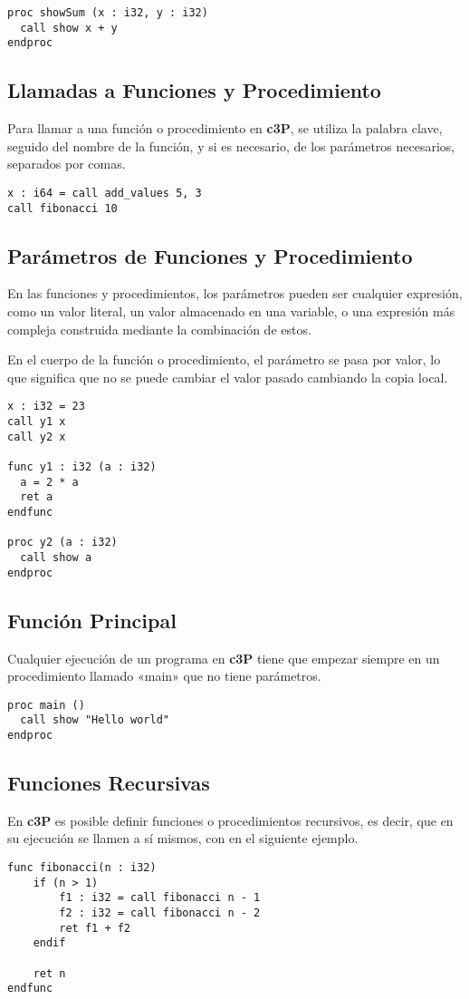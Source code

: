\begin{verbatim}
proc showSum (x : i32, y : i32)
  call show x + y
endproc
\end{verbatim}

\subsection{Llamadas a Funciones y Procedimiento}

Para llamar a una función o procedimiento en \textbf{c3P}, se utiliza la palabra clave,
seguido del nombre de la función, y si es necesario, de los parámetros necesarios, separados
por comas.

\begin{verbatim}
x : i64 = call add_values 5, 3
call fibonacci 10
\end{verbatim}

\subsection{Parámetros de Funciones y Procedimiento}

En las funciones y procedimientos, los parámetros pueden ser cualquier expresión, como
un valor literal, un valor almacenado en una variable, o una expresión más compleja
construida mediante la combinación de estos.

En el cuerpo de la función o procedimiento, el parámetro se pasa por valor, lo que
significa que no se puede cambiar el valor pasado cambiando la copia local.

\begin{verbatim}
x : i32 = 23
call y1 x
call y2 x

func y1 : i32 (a : i32)
  a = 2 * a
  ret a
endfunc

proc y2 (a : i32)
  call show a
endproc
\end{verbatim}

\subsection{Función Principal}

Cualquier ejecución de un programa en \textbf{c3P} tiene que empezar siempre en
un procedimiento llamado «main» que no tiene parámetros.

\begin{verbatim}
proc main ()
  call show "Hello world"
endproc
\end{verbatim}

\subsection{Funciones Recursivas}

En \textbf{c3P} es posible definir funciones o procedimientos recursivos,
es decir, que en su ejecución se llamen a sí mismos, con en el siguiente ejemplo.

\begin{verbatim}
func fibonacci(n : i32)
    if (n > 1)
        f1 : i32 = call fibonacci n - 1
        f2 : i32 = call fibonacci n - 2
        ret f1 + f2
    endif

    ret n
endfunc
\end{verbatim}
